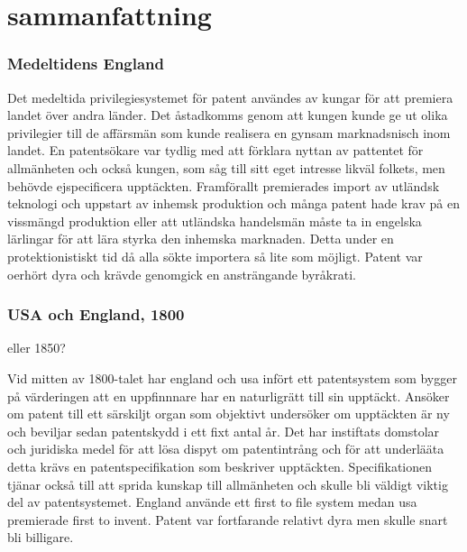 \section{sammanfattning}
\subsubsection{Medeltidens England}

Det medeltida privilegiesystemet för patent användes av kungar för att premiera landet över andra länder. Det åstadkomms genom att kungen kunde ge ut olika privilegier till de affärsmän som kunde realisera en gynsam marknadsnisch inom landet. En patentsökare var tydlig med att förklara nyttan av pattentet för allmänheten och också kungen, som såg till sitt eget intresse likväl folkets, men behövde ejspecificera upptäckten. Framförallt premierades import av utländsk teknologi och uppstart av inhemsk produktion och många patent hade krav på en vissmängd produktion eller att utländska handelsmän måste ta in engelska lärlingar för att lära styrka den inhemska marknaden. Detta under en protektionistiskt tid då alla sökte importera så lite som möjligt. Patent var oerhört dyra och krävde genomgick en ansträngande byråkrati.

\subsubsection{USA och England, 1800} eller 1850?

Vid mitten av 1800-talet har england och usa infört ett patentsystem som bygger på värderingen att en uppfinnnare har en naturligrätt till sin upptäckt. Ansöker om patent till ett särskiljt organ som objektivt undersöker om upptäckten är ny och beviljar sedan patentskydd i ett fixt antal år. Det har instiftats domstolar och juridiska medel för att lösa dispyt om patentintrång och för att underlääta detta krävs en patentspecifikation som beskriver upptäckten. Specifikationen tjänar också till att sprida kunskap till allmänheten och skulle bli väldigt viktig del av patentsystemet. England använde ett first to file system medan usa premierade first to invent. Patent var fortfarande relativt dyra men skulle snart bli billigare.

